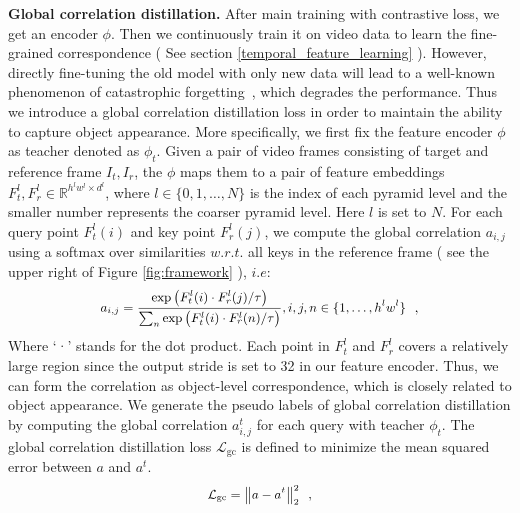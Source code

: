 \documentclass{article}
\begin{document}
\textbf{Global correlation distillation.} After main training with contrastive loss, we get an encoder $\phi$. Then we continuously train it on video data to learn the fine-grained correspondence ( See section \ref{temporal_feature_learning} ). However, directly fine-tuning the old model with only new data will lead to a well-known phenomenon of catastrophic forgetting~\cite{li2017learning}, which degrades the performance. Thus we introduce a global correlation distillation loss in order to maintain the ability to capture object appearance. More specifically, we first fix the feature encoder $\phi$ as teacher denoted as $\phi_t$. Given a pair of video frames consisting of target and reference frame $I_{t}, I_r$, the  $\phi$ maps them to a pair of feature embeddings $F^l_t,F^l_{r} \in \mathbb{R}^{h^l w^l \times d^l}$, where $l \in \{0, 1, \ldots, N \}$ is the index of each pyramid level and the smaller number represents the coarser pyramid level. Here $l$ is set to $N$. For each query point $F^l_t(i)$ and key point $F^l_r(j)$, we compute the global correlation $a_{i, j}$ using a softmax over similarities $w. r. t.$ all keys in the reference frame ( see the upper right of Figure \ref{fig:framework} ), $i. e$:
\begin{equation}\label{eq:global_correlation}
  \small
  \begin{aligned}
    a_{i, j}=\frac{\exp \left(F^l_t(i)  \cdot F^l_r(j) / \tau\right)}{\sum_{n} \exp \left(F^l_t(i) \cdot F^l_r(n) / \tau\right)}, i,j,n \in \{1,\ldots,h^lw^l\}
  \end{aligned}~~,
\end{equation}
Where ‘·’ stands for the dot product. Each point in $F^l_t$ and $F^l_{r}$ covers a relatively large region since the output stride is set to 32 in our feature encoder. Thus, we can form the correlation as object-level correspondence, which is closely related to object appearance. We generate the pseudo labels of global correlation distillation by computing the global correlation  $a^t_{i, j}$ for each query with teacher $\phi_t$. The global correlation distillation loss $\mathcal{L}_{\mathrm{gc}}$ is defined to minimize the mean squared error between $a$ and $a^t$.
\begin{equation}\label{eq:global_correlation_loss}
  \small
  \begin{aligned}
    \mathcal{L}_{\mathrm{gc}}  = \left\|a-a^t\right\|_{2}^{2}
  \end{aligned}~~,
\end{equation}
\end{document}
